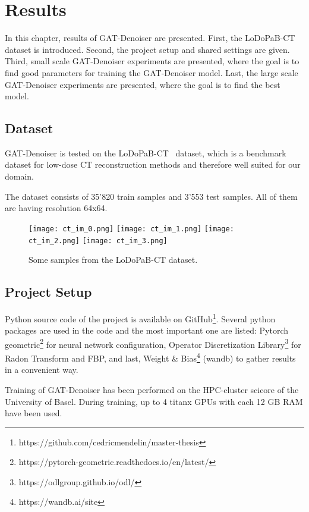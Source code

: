 \chapter{Results}
\label{sec:results}

In this chapter, results of GAT-Denoiser are presented.
First, the LoDoPaB-CT dataset is introduced.
Second, the project setup and shared settings are given.
Third, small scale GAT-Denoiser experiments are presented, where the goal is to find
good parameters for training the GAT-Denoiser model. 
Last, the large scale GAT-Denoiser experiments are presented, where the goal is 
to find the best model.



\section{Dataset}
GAT-Denoiser is tested on the LoDoPaB-CT~\cite{lodopab-dataset} dataset, which is a 
benchmark dataset for low-dose CT reconstruction methods and therefore well suited for our domain.

The dataset consists of 35'820 train samples and 3'553 test samples.
All of them are having resolution 64x64.

\begin{figure}[H]
  \centering
  \hfill
  \texttt{[image: ct\_im\_0.png]}
  \hfill
  \texttt{[image: ct\_im\_1.png]}
  \hfill
  \texttt{[image: ct\_im\_2.png]}
  \hfill
  \texttt{[image: ct\_im\_3.png]}
  \hfill
  \caption{Some samples from the LoDoPaB-CT dataset.}
\end{figure}



\section{Project Setup}
Python source code of the project is available on GitHub\footnote{https://github.com/cedricmendelin/master-thesis}.
Several python packages are used in the code and the most important one are listed: Pytorch geometric\footnote{https://pytorch-geometric.readthedocs.io/en/latest/} 
for neural network configuration, Operator Discretization Library\footnote{https://odlgroup.github.io/odl/} for Radon Transform and FBP, 
and last, Weight \& Bias\footnote{https://wandb.ai/site} (wandb) to gather results in a convenient way.

Training of GAT-Denoiser has been performed on the HPC-cluster scicore of the University of Basel.
During training, up to 4 titanx GPUs with each 12 GB RAM have been used.


